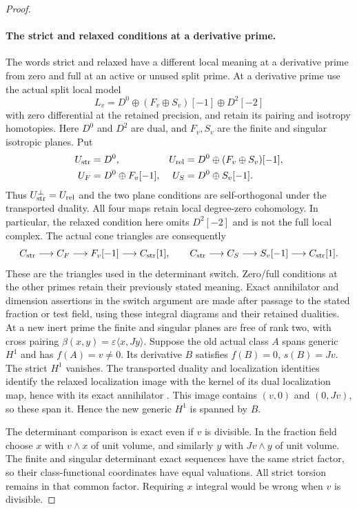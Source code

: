 \documentclass[11pt]{article}
\theoremstyle{definition}
\theoremstyle{remark}
\begin{document}
\begin{proof}\leavevmode
\paragraph{The strict and relaxed conditions at a derivative prime.}
The words strict and relaxed have a different local meaning at a
derivative prime from zero and full at an active or unused split
prime. At a derivative prime use the actual split local model
\[
 L_v=D^0\oplus(F_v\oplus S_v)[-1]\oplus D^2[-2]
\]
with zero differential at the retained precision, and retain its
pairing and isotropy homotopies. Here $D^0$ and $D^2$ are dual,
and $F_v,S_v$ are the finite and singular isotropic planes. Put
\[
 \begin{aligned}
 U_{\rm str}&=D^0,&
 U_{\rm rel}&=D^0\oplus(F_v\oplus S_v)[-1],\\
 U_F&=D^0\oplus F_v[-1],&
 U_S&=D^0\oplus S_v[-1].
 \end{aligned}
\]
Thus $U_{\rm str}^{\perp}=U_{\rm rel}$ and the two plane
conditions are self-orthogonal under the transported duality.
All four maps retain local degree-zero cohomology. In particular,
the relaxed condition here omits $D^2[-2]$ and is not the full
local complex. The actual cone triangles are consequently
\[
 C_{\rm str}\longrightarrow C_F\longrightarrow F_v[-1]
 \longrightarrow C_{\rm str}[1],\qquad
 C_{\rm str}\longrightarrow C_S\longrightarrow S_v[-1]
 \longrightarrow C_{\rm str}[1].
\]
These are the triangles used in the determinant switch. Zero/full
conditions at the other primes retain their previously stated
meaning. Exact annihilator and dimension assertions in the switch
argument are made after passage to the stated fraction or test
field, using these integral diagrams and their retained dualities.
At a new inert prime the finite and singular planes are free of rank
two, with cross pairing
$\beta(x,y)=\varepsilon\langle x,Jy\rangle$.
Suppose the old actual class $A$ spans generic $H^1$ and has
$f(A)=v\ne0$. Its derivative $B$ satisfies $f(B)=0$, $s(B)=Jv$.
The strict $H^1$ vanishes. The transported duality and localization
identities identify the relaxed localization image with the kernel
of its dual localization map, hence with its exact annihilator
\cite[Sections 6.3.3--6.3.4]{nekovar}. This image
contains $(v,0)$ and $(0,Jv)$, so these span
it. Hence the new generic $H^1$ is spanned by $B$.

The determinant comparison is exact even if $v$ is divisible.
In the fraction field choose $x$ with $v\wedge x$ of unit volume,
and similarly $y$ with $Jv\wedge y$ of unit volume.
The finite and singular determinant exact sequences have the same
strict factor, so their class-functional coordinates have equal
valuations. All strict torsion remains in that common factor.
Requiring $x$ integral would be wrong when $v$ is divisible.
\end{proof}
\end{document}
